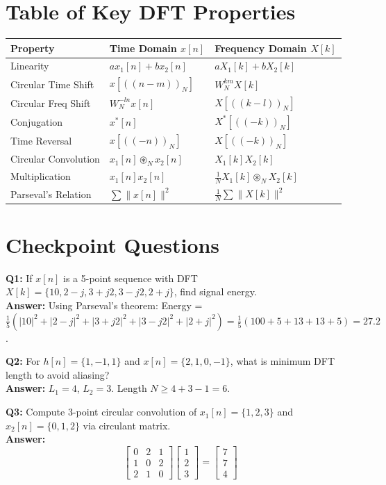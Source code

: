 \documentclass[11pt,a4paper]{article}
\begin{document}
\section{Table of Key DFT Properties}

\begin{table}[H]
\centering
\begin{tabular}{lll}
\toprule
\textbf{Property} & \textbf{Time Domain $x[n]$} & \textbf{Frequency Domain $X[k]$} \\
\midrule
Linearity & $a x_1[n] + b x_2[n]$ & $a X_1[k] + b X_2[k]$ \\
Circular Time Shift & $x[((n-m))_N]$ & $W_N^{km} X[k]$ \\
Circular Freq Shift & $W_N^{-ln} x[n]$ & $X[((k-l))_N]$ \\
Conjugation & $x^*[n]$ & $X^*[((-k))_N]$ \\
Time Reversal & $x[((-n))_N]$ & $X[((-k))_N]$ \\
Circular Convolution& $x_1[n] \circledast_N x_2[n]$ & $X_1[k] X_2[k]$ \\
Multiplication & $x_1[n] x_2[n]$ & $\frac{1}{N} X_1[k] \circledast_N X_2[k]$ \\
Parseval's Relation & $\sum \|x[n]\|^2$ & $\frac{1}{N} \sum \|X[k]\|^2$ \\
\bottomrule
\end{tabular}
\end{table}

\section{Checkpoint Questions}

\textbf{Q1:} If $x[n]$ is a 5-point sequence with DFT $X[k] = \{10, 2-j, 3+j2, 3-j2, 2+j\}$, find signal energy. \\
\textbf{Answer:} Using Parseval's theorem:
Energy = $\frac{1}{5} (|10|^2 + |2-j|^2 + |3+j2|^2 + |3-j2|^2 + |2+j|^2) = \frac{1}{5} (100 + 5 + 13 + 13 + 5) = 27.2$.

\textbf{Q2:} For $h[n] = \{1, -1, 1\}$ and $x[n] = \{2, 1, 0, -1\}$, what is minimum DFT length to avoid aliasing? \\
\textbf{Answer:} $L_1 = 4$, $L_2 = 3$. Length $N \ge 4 + 3 - 1 = 6$.

\textbf{Q3:} Compute 3-point circular convolution of $x_1[n] = \{1, 2, 3\}$ and $x_2[n] = \{0, 1, 2\}$ via circulant matrix. \\
\textbf{Answer:} 
\begin{equation*}
\begin{bmatrix} 0 & 2 & 1 \\ 1 & 0 & 2 \\ 2 & 1 & 0 \end{bmatrix} \begin{bmatrix} 1 \\ 2 \\ 3 \end{bmatrix} = \begin{bmatrix} 7 \\ 7 \\ 4 \end{bmatrix}
\end{equation*}
\end{document}
